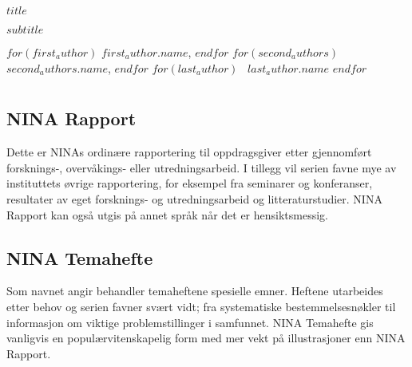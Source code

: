 \documentclass[11pt, a4paper]{article}
\begin{document}

\begin{titlepage}
\thispagestyle{titlefooter}

\Huge{$title$} \par\vspace{.3cm}
\huge{$subtitle$} \par\vspace{.6cm}
$for(first_author)$
\hspace{0cm}\Large{$first_author.name$},
$endfor$
$for(second_authors)$
\hspace{-2mm}~\Large{$second_authors.name$},
$endfor$
$for(last_author)$
\hspace{-2mm}~\Large{$last_author.name$}
$endfor$

\restoregeometry
\end{titlepage}
\cfoot{}

\section*{}


\subsection*{\small{NINA Rapport}}
{\small Dette er NINAs ordinære rapportering til oppdragsgiver etter gjennomført forsknings\hyp{}, overvåkings\hyp{} eller utredningsarbeid. I tillegg vil serien favne mye av instituttets øvrige rapportering, for eksempel
fra seminarer og konferanser, resultater av eget forsknings\hyp{} og utredningsarbeid og litteraturstudier.
NINA Rapport kan også utgis på annet språk når det er hensiktsmessig.}

\subsection*{\small{NINA Temahefte}}
{\small Som navnet angir behandler temaheftene spesielle emner. Heftene utarbeides etter behov og
serien favner svært vidt; fra systematiske bestemmelsesnøkler til informasjon om viktige
problemstillinger i samfunnet. NINA Temahefte gis vanligvis en populærvitenskapelig form med mer
vekt på illustrasjoner enn NINA Rapport.}
\end{document}
